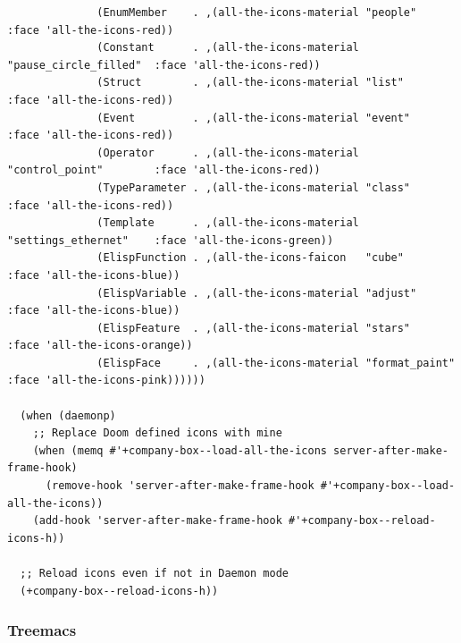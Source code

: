 \documentclass[11pt]{article}
\begin{document}
\begin{verbatim}
              (EnumMember    . ,(all-the-icons-material "people"               :face 'all-the-icons-red))
              (Constant      . ,(all-the-icons-material "pause_circle_filled"  :face 'all-the-icons-red))
              (Struct        . ,(all-the-icons-material "list"                 :face 'all-the-icons-red))
              (Event         . ,(all-the-icons-material "event"                :face 'all-the-icons-red))
              (Operator      . ,(all-the-icons-material "control_point"        :face 'all-the-icons-red))
              (TypeParameter . ,(all-the-icons-material "class"                :face 'all-the-icons-red))
              (Template      . ,(all-the-icons-material "settings_ethernet"    :face 'all-the-icons-green))
              (ElispFunction . ,(all-the-icons-faicon   "cube"                 :face 'all-the-icons-blue))
              (ElispVariable . ,(all-the-icons-material "adjust"               :face 'all-the-icons-blue))
              (ElispFeature  . ,(all-the-icons-material "stars"                :face 'all-the-icons-orange))
              (ElispFace     . ,(all-the-icons-material "format_paint"         :face 'all-the-icons-pink))))))

  (when (daemonp)
    ;; Replace Doom defined icons with mine
    (when (memq #'+company-box--load-all-the-icons server-after-make-frame-hook)
      (remove-hook 'server-after-make-frame-hook #'+company-box--load-all-the-icons))
    (add-hook 'server-after-make-frame-hook #'+company-box--reload-icons-h))

  ;; Reload icons even if not in Daemon mode
  (+company-box--reload-icons-h))
\end{verbatim}

\subsubsection{Treemacs}
\label{sec:org9c82796}
\end{document}
